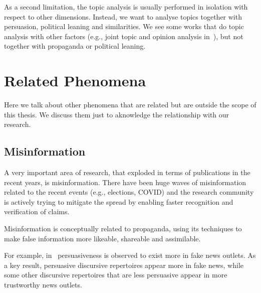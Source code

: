 As a second limitation, the topic analysis is usually performed in isolation with respect to other dimensions.
Instead, we want to analyse topics together with persuasion, political leaning and similarities.
We see some works that do topic analysis with other factors (e.g., joint topic and opinion analysis in~\cite{stoyanov2008topic}), but not together with propaganda or political leaning.

\section{\statusgreen Related Phenomena}
\label{sec:lit_related}

Here we talk about other phenomena that are related but are outside the scope of this thesis.
We discuss them just to aknowledge the relationship with our research.


\subsection{Misinformation}
\label{sec:lit_related_misinformation}

A very important area of research, that exploded in terms of publications in the recent years, is misinformation.
There have been huge waves of misinformation related to the recent events (e.g., elections, COVID) and the research community is actively trying to mitigate the spread by enabling faster recognition and verification of claims.

Misinformation is conceptually related to propaganda, using its techniques to make false information more likeable, shareable and assimilable.


For example, in~\citet{orrumachine} persuasiveness is observed to exist more in fake news outlets. As a key result, persuasive discursive repertoires appear more in fake news, while some other discursive repertoires that are less persuasive appear in more trustworthy news outlets.

